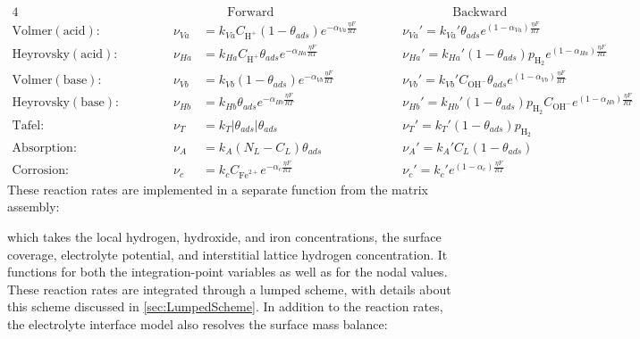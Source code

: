 \documentclass[3p]{elsarticle} %
\begin{document}
\begin{alignat}{4}
\nonumber && && & \qquad\mathrm{Forward} &&  \qquad\qquad \mathrm{Backward} \\
    \mathrm{Volmer (acid):} && \quad && \nu_{Va} &= k_{Va} C_{\mathrm{H}^+}(1-\theta_{ads})e^{-\alpha_{Va} \frac{\eta F}{RT}}\qquad
    && \nu_{Va}' = k_{Va}' \theta_{ads}e^{(1-\alpha_{Va}) \frac{\eta F}{RT}} \label{eq:react1}\\
    \mathrm{Heyrovsky (acid):} && && \nu_{Ha} &= k_{Ha} C_{\mathrm{H}^+}\theta_{ads}e^{-\alpha_{Ha} \frac{\eta F}{RT}}\qquad
    && \nu_{Ha}' = k_{Ha}' (1-\theta_{ads}) p_{\mathrm{H}_2} e^{(1-\alpha_{Ha}) \frac{\eta F}{RT}} \label{eq:react2}\\
    \mathrm{Volmer (base):} && && \nu_{Vb} &= k_{Vb} (1-\theta_{ads})e^{-\alpha_{Vb} \frac{\eta F}{RT}}\qquad
    && \nu_{Vb}' = k_{Vb}' C_{\mathrm{OH}^-} \theta_{ads}e^{(1-\alpha_{Vb}) \frac{\eta F}{RT}} \label{eq:react5}\\
    \mathrm{Heyrovsky (base):} && && \nu_{Hb} &= k_{Hb} \theta_{ads}e^{-\alpha_{Hb} \frac{\eta F}{RT}}\qquad
    && \nu_{Hb}' = k_{Hb}' (1-\theta_{ads}) p_{\mathrm{H}_2} C_{\mathrm{OH}^-} e^{(1-\alpha_{Hb}) \frac{\eta F}{RT}}  \label{eq:react6}\\
    \mathrm{Tafel:} && && \nu_T &= k_T\left|\theta_{ads}\right|\theta_{ads}\qquad
    && \nu_T' = k_T' (1-\theta_{ads})p_{\mathrm{H}_2} \label{eq:react3}\\
    \mathrm{Absorption:} && && \nu_A &= k_A (N_L - C_L)\theta_{ads}\qquad
    && \nu_A' = k_A' C_L (1-\theta_{ads}) \label{eq:react4}\\
    \mathrm{Corrosion:} && && \nu_{c} &= k_{c} C_{\mathrm{Fe}^{2+}}e^{-\alpha_{c} \frac{\eta F}{RT}} \qquad && \nu_{c}' = k_{c}' e^{(1-\alpha_{c}) \frac{\eta F}{RT}}   \label{eq:react7}
\end{alignat}
These reaction rates are implemented in a separate function from the matrix assembly:

which takes the local hydrogen, hydroxide, and iron concentrations, the surface coverage, electrolyte potential, and interstitial lattice hydrogen concentration. It functions for both the integration-point variables as well as for the nodal values. These reaction rates are integrated through a lumped scheme, with details about this scheme discussed in \cref{sec:LumpedScheme}. In addition to the reaction rates, the electrolyte interface model also resolves the surface mass balance:
\end{document}
